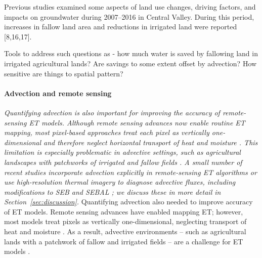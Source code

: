 \documentclass{article}
\begin{document}
    Previous studies examined some aspects of land use changes, driving factors, and impacts on groundwater during 2007–2016 in Central Valley. During this period, increases in fallow land area and reductions in irrigated land were reported [8,16,17]. 

    
    Tools to address such questions as - how much water is saved by fallowing land in irrigated agricultural lands? 
    Are savings to some extent offset by advection? 
    How sensitive are things to spatial pattern?

    \paragraph{Advection and remote sensing}
    \medskip 

    \textit{Quantifying advection is also important for improving the accuracy of remote-sensing ET models. Although remote sensing advances now enable routine ET mapping, most pixel-based approaches treat each pixel as vertically one-dimensional and therefore neglect horizontal transport of heat and moisture \cite{liou2014evapotranspiration, mcshane2017review}. This limitation is especially problematic in advective settings, such as agricultural landscapes with patchworks of irrigated and fallow fields \cite{derardja2024advancements}. A small number of recent studies incorporate advection explicitly in remote-sensing ET algorithms or use high-resolution thermal imagery to diagnose advective fluxes, including modifications to SEB and SEBAL \cite{liu2016regional, mkhwanazi2015sebal, wang2024advection}; we discuss these in more detail in Section~\ref{sec:discussion}.
    }
    Quantifying advection also needed to improve accuracy of ET models.
    Remote sensing advances have enabled mapping ET; however, most models treat pixels as vertically one-dimensional, neglecting transport of heat and moisture \cite{liou2014evapotranspiration, mcshane2017review}.
    As a result, advective environments -- such as agricultural lands with a patchwork of fallow and irrigated fields  -- are a challenge for ET models \cite{derardja2024advancements}.
\end{document}
